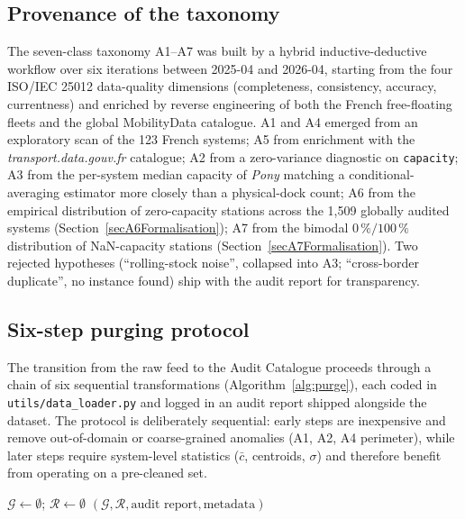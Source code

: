 \documentclass[11pt,a4paper]{article}
\begin{document}
\subsection{Provenance of the taxonomy}
The seven-class taxonomy A1--A7 was built by a hybrid
inductive-deductive workflow over six iterations between 2025-04
and 2026-04, starting from the four ISO/IEC 25012 data-quality
dimensions (completeness, consistency, accuracy, currentness)
and enriched by reverse engineering of both the French
free-floating fleets and the global MobilityData catalogue.
A1 and A4 emerged from an exploratory scan of the 123 French
systems; A5 from enrichment with the
\emph{transport.data.gouv.fr} catalogue; A2 from a zero-variance
diagnostic on \texttt{capacity}; A3 from the per-system median
capacity of \emph{Pony} matching a conditional-averaging
estimator more closely than a physical-dock count; A6 from the
empirical distribution of zero-capacity stations across the
1{,}509 globally audited systems
(Section~\ref{secA6Formalisation}); A7 from the bimodal
$0\,\%/100\,\%$ distribution of NaN-capacity stations
(Section~\ref{secA7Formalisation}). Two rejected hypotheses
(``rolling-stock noise'', collapsed into A3; ``cross-border
duplicate'', no instance found) ship with the audit report
for transparency.

\subsection{Six-step purging protocol}
The transition from the raw feed to the Audit Catalogue proceeds through
a chain of six sequential transformations (Algorithm~\ref{alg:purge}),
each coded in \texttt{utils/data\_loader.py} and logged in an audit
report shipped alongside the dataset. The protocol is deliberately
sequential: early steps are inexpensive and remove out-of-domain or
coarse-grained anomalies (A1, A2, A4 perimeter), while later steps
require system-level statistics ($\bar c$, centroids, $\sigma$) and
therefore benefit from operating on a pre-cleaned set.

\begin{algorithm}[ht]
\SetAlgoLined
\DontPrintSemicolon
{}
$\mathcal{G} \gets \emptyset$; $\mathcal{R} \gets \emptyset$\;
\Return $(\mathcal{G}, \mathcal{R}, \text{audit report}, \text{metadata})$\;
\caption{GBFS-to-Gold-Standard purging pipeline.}
\label{alg:purge}
\end{algorithm}
\end{document}

